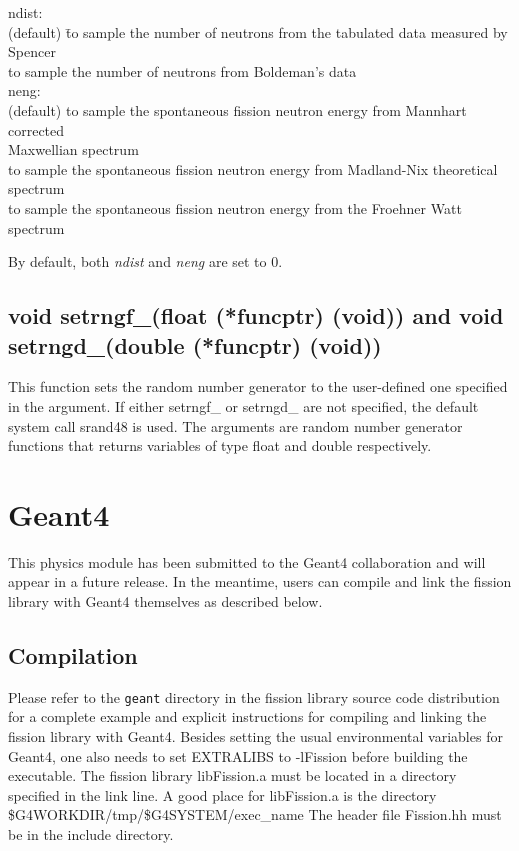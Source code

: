\documentclass[fleqn,11pt]{article}
\begin{document}
\begin{tabbing}
\indent ndist: \= \\
\indent {} (default) \= to sample the number of neutrons 
from the tabulated data measured by Spencer \\
\indent {} \> to sample the number of neutrons from 
Boldeman's data \\
\indent neng: \\
\indent {} \> (default) to sample the spontaneous fission 
neutron energy from Mannhart corrected \\
\> \> Maxwellian spectrum \\
\indent {} \> to sample the spontaneous fission neutron 
energy from Madland-Nix theoretical \\
\> \> spectrum \\
\indent {} \> to sample the spontaneous fission neutron 
energy from the Froehner Watt spectrum \\
\end{tabbing}

By default, both \textit{ndist} and \textit{neng} are set to 0.

\subsection{void setrngf\_(float (*funcptr) (void)) and void setrngd\_(double (*funcptr) (void))}

This function sets the random number generator to the user-defined
one specified in the argument. If either setrngf\_ or setrngd\_ are
not specified, the default system call srand48 is used. The 
arguments are random number generator functions that returns 
variables of type float and double respectively.


\pagebreak
\section{Geant4}

This physics module has been submitted to
the Geant4 collaboration and will appear in a future release. In the meantime,
users can compile and link the fission library with Geant4 themselves as
described below. 

\subsection{Compilation}

Please refer to the {\tt geant} directory in the fission library
source code distribution for a complete example and explicit
instructions for compiling and linking the fission library with
Geant4. Besides setting the usual environmental variables for Geant4,
one also needs to set EXTRALIBS to -lFission before building the
executable. The fission library libFission.a must be located in a
directory specified in the link line. A good place for libFission.a is
the directory \$G4WORKDIR/tmp/\$G4SYSTEM/exec\_name The header file
Fission.hh must be in the include directory.
\end{document}
